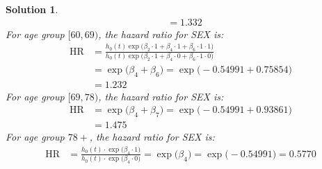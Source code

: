 \documentclass[11pt]{article}
\newtheorem{sol}{Solution}
\begin{document}
\begin{sol}
\begin{align*}
		&= 1.332
	\end{align*}
	For age group $[60, 69)$, the hazard ratio for SEX is:
	\begin{align*}
		\text{HR} &= \frac{h_0(t)\exp\Big(\beta_2\cdot 1 + \beta_4\cdot 1 + \beta_6\cdot 1\cdot 1\Big)}{h_0(t)\exp\Big(\beta_2\cdot 1 + \beta_4\cdot 0 + \beta_6\cdot 1\cdot 0\Big)}\\
		&= \exp\Big(\beta_4 + \beta_6\Big) = \exp\Big(-0.54991 + 0.75854\Big)\\
		&= 1.232
	\end{align*}
	For age group $[69, 78)$, the hazard ratio for SEX is:
	\begin{align*}
		\text{HR} &= \exp\Big(\beta_4 + \beta_7\Big) = \exp\Big(-0.54991 + 0.93861\Big)\\
		&= 1.475
	\end{align*}
	For age group $78+$, the hazard ratio for SEX is:
	\begin{align*}
		\text{HR} &= \frac{h_0(t)\cdot \exp\Big(\beta_4\cdot 1\Big)}{h_0(t)\cdot \exp\Big(\beta_4\cdot 0\Big)} = \exp\Big(\beta_4\Big) = \exp \Big(-0.54991\Big) = 0.5770
	\end{align*}
	\vskip 2mm

\end{sol}
\end{document}

